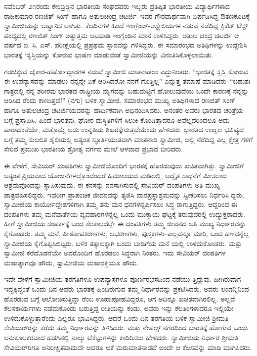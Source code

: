 ನವೆಂಬರ್ ೨೧ರಂದು ಕೇಂಬ್ರಿಡ್ಜಿನ ಭಾರತೀಯ ಸಂಘದವರು ಇಬ್ಬರು ಪ್ರತಿಷ್ಠಿತ ಭಾರತೀಯ ವಿದ್ಯಾರ್ಥಿಗಳಾದ ರಾಜಕುಮಾರ ರಣಜಿತ್ ಸಿಂಗ್ ಹಾಗೂ ಅತುಲಚಂದ್ರ ಚಟರ್ಜಿ–ಇವರ ಗೌರವಾರ್ಥವಾಗಿ ಏರ್ಪಡಿಸಿದ್ದ ಔತಣಕೂಟಕ್ಕೆ ಸ್ವಾಮೀಜಿಯನ್ನು ಆಹ್ವಾನಿಸ ಲಾಗಿತ್ತು. ಕೆಲದಿನಗಳ ಹಿಂದೆ ಇಂಗ್ಲೆಂಡ್​-ಆಸ್ಟ್ರೇಲಿಯಗಳ ನಡುವೆ ನಡೆದಿದ್ದ ಕ್ರಿಕೆಟ್ ಟೆಸ್ಟ್ ಪಂದ್ಯದಲ್ಲಿ ರಣಜಿತ್ ಸಿಂಗ್ ಅತ್ಯುತ್ತಮ ಆಟವಾಡಿ ಇಂಗ್ಲೆಂಡಿನ ಮಾನ ಉಳಿಸಿದ್ದರು. ಅತುಲ ಚಂದ್ರ ಚಟರ್ಜಿ ಆ ವರ್ಷದ ಐ. ಸಿ. ಎಸ್. ಪರೀಕ್ಷೆಯಲ್ಲಿ ಪ್ರಪ್ರಥಮ ಸ್ಥಾನವನ್ನು ಗಳಿಸಿದ್ದರು. ಈ ಸಮಾರಂಭದ ಅತಿಥಿಗಳನ್ನು ಉದ್ದೇಶಿಸಿ ಭಾರತಕ್ಕೆ ‘ಸ್ವಸ್ತಿಯನ್ನು ಕೋರುವ ಭಾಷಣ ಮಾಡುವಂತೆ ಸ್ವಾಮೀಜಿಯನ್ನು ವಿನಂತಿಸಿಕೊಳ್ಳಲಾಯಿತು.

ಗಡಚಿಕ್ಕುವ ಜೈಕಾರ-ಹರ್ಷೋದ್ಗಾರಗಳ ನಡುವೆ ಸ್ವಾಮೀಜಿ ಮಾತನಾಡಲು ಎದ್ದುನಿಂತರು. “ಭಾರತಕ್ಕೆ ಸ್ವಸ್ತಿ ಕೋರುವ ಈ ಉಪನ್ಯಾಸವನ್ನು ಮಾಡಲು ನನ್ನನ್ನೇ ಏಕೆ ಆರಿಸಿದರೋ ನನಗೆ ಗೊತ್ತಿಲ್ಲ” ಎನ್ನುತ್ತ ತಮಾಷೆ ಮಾಡಿದರು–“ಬಹುಶಃ ಗಾತ್ರದಲ್ಲಿ ನನ್ನ ಶರೀರವು ಭಾರತದ ರಾಷ್ಟ್ರೀಯ ಮೃಗವನ್ನು ಬಹುಮಟ್ಟಿಗೆ ಹೋಲುವುದೆಂಬ ಒಂದೇ ಕಾರಣಕ್ಕೆ ನನ್ನನ್ನು ಆರಿಸಿದ ರೆಂದು ಕಾಣುತ್ತದೆ!” (ನಗು) ಬಳಿಕ ಸ್ವಾಮೀಜಿ, ಸಮಾರಂಭದ ಮುಖ್ಯ ಅತಿಥಿಗಳಾದ ರಣಜಿತ್ ಸಿಂಗ್ ಹಾಗೂ ಅತುಲಚಂದ್ರ ಚಟರ್ಜಿಯವರನ್ನು ಹಾರ್ದಿಕವಾಗಿ ಅಭಿನಂದಿಸಿದರು. ಅನಂತರ ಅವರು ಭಾರತದ ಚರಿತ್ರೆಯ ಬಗ್ಗೆ ಪ್ರಸ್ತಾಪಿಸಿ, ಹಿಂದೆ ಭಾರತವು, ಘೋರ ದುಸ್ಥಿತಿಗಳಿಗೆ ಸಿಲುಕಿ ಕೊಂಡಿತ್ತಾದರೂ ಅವೆಲ್ಲದರಿಂದಲೂ ಅದು ಪಾರಾದಂತೆಯೇ, ಮತ್ತೊಮ್ಮೆ ಅದು ಉನ್ನತಿಯ ಶಿಖರಕ್ಕೇರುತ್ತದೆಯೆಂದು ಹೇಳಿದರು. ಭಾರತದ ಉಜ್ವಲ ಭವಿಷ್ಯದ ಬಗ್ಗೆ ತಮ್ಮ ಸುಲಲಿತ ಶೈಲಿಯಲ್ಲಿ ಅತ್ಯಂತ ಸ್ಫೂರ್ತಿಯುತವಾಗಿ ಮಾತನಾಡಿ ಸ್ವಾಮೀಜಿ, ಅಲ್ಲಿ ನೆರೆದಿದ್ದ ಎಲ್ಲ ಕ್ಷೇತ್ರ ಗಳಿಗೆ ಸೇರಿದ ಪ್ರಮುಖ ಭಾರತೀಯ ಶ್ರೋತೃ ವರ್ಗದ ಮೇಲೆ ಆಳವಾದ ಪ್ರಭಾವ ಬೀರಿದರು.

ಈ ವೇಳೆಗೆ, ಸೇವಿಯರ್ ದಂಪತಿಗಳು ಸ್ವಾಮೀಜಿಯೊಂದಿಗೆ ಭಾರತಕ್ಕೆ ಹೊರಡುವುದು ಖಚಿತವಾಗಿತ್ತು. ಸ್ವಾಮೀಜಿಗೆ ಅತ್ಯಂತ ಪ್ರಿಯವಾದ ಯೋಜನೆಗಳಲ್ಲೊಂದೆಂದರೆ ಹಿಮಾಲಯದ ಮಡಿಲಲ್ಲಿ, ಅದ್ವೈತ ಸಾಧನೆಗೆ ಮೀಸಲಾದ ಆಶ್ರಮವೊಂದನ್ನು ಸ್ಥಾಪಿಸುವುದು. ಈ ಕನಸನ್ನು ನನಸಾಗಿಸುವಲ್ಲಿ ಸೇವಿಯರ್ ದಂಪತಿಗಳು ಅತಿ ಮುಖ್ಯ ಪಾತ್ರವಹಿಸಲಿದ್ದರು. ಇವರೀಗ ಪ್ರಾಪಂಚಿಕ ಜೀವನವನ್ನು ತ್ಯಜಿಸಿ ವಾನಪ್ರಸ್ಥಾಶ್ರಮವನ್ನು ಸ್ವೀಕರಿಸಲು ನಿರ್ಧರಿಸಿ ದ್ದರು; ಸ್ವಾಮೀಜಿಯ ಕಾರ್ಯೋದ್ದೇಶಗಳಿಗಾಗಿ ತಮ್ಮ ತನು ಮನ ಧನಗಳನ್ನರ್ಪಿಸಲು ಸಿದ್ಧ ರಾಗುತ್ತಿದ್ದರು. ಆದ್ದರಿಂದ ಈ ದಂಪತಿಗಳು ತಮ್ಮ ಮನೆವಾರ್ತೆಯ ವ್ಯವಹಾರಗಳನ್ನೆಲ್ಲ ಒಂದು ಮುಕ್ತಾಯ ಘಟ್ಟಕ್ಕೆ ತರುವುದರಲ್ಲಿ ಉದ್ಯುಕ್ತರಾದರು. ಹೀಗೆ ಸ್ವಾಮೀಜಿಯ ಸಂಪರ್ಕಕ್ಕೆ ಬಂದ ಕೆಲಕಾಲದಲ್ಲೇ ಈ ದಂಪತಿಗಳು ತಮ್ಮ ಜೀವನದ ಅತಿ ಮುಖ್ಯ ನಿರ್ಧಾರವನ್ನು ಕೈಗೊಂಡರು. ತಮ್ಮ ಮನೆ, ಪೀಠೋಪಕರಣಗಳು, ಆಭರಣಗಳು, ಪುಸ್ತಕಗಳು–ಎಲ್ಲವನ್ನೂ ಮಾರಿ, ಬಂದ ಹಣವನ್ನೆಲ್ಲ ಸ್ವಾಮೀಜಿಯ ಕೈಗೊಪ್ಪಿಸಿಬಿಟ್ಟರು. ಬಳಿಕ ತತ್ಕಾಲಕ್ಕಾಗಿ ಒಂದು ಬಾಡಿಗೆಯ ಮನೆ ಯಲ್ಲಿ ಉಳಿದುಕೊಂಡರು. ಮತ್ತು ಸ್ವಾಮೀಜಿ ಕರೆದೊಡನೆಯೇ ಅವರೊಂದಿಗೆ ಹೊರಡಲು ಸಿದ್ಧರಾಗಿ ನಿಂತರು. ಇದು ಸೇವಿಯರ್ ದಂಪತಿಗಳ ಮಹಾತ್ಯಾಗವೂ ಹೌದು, ಸ್ವಾಮೀಜಿಯ ಮಹಾಶಕ್ತಿಯೂ ಹೌದು.

ಇದೇ ವೇಳೆಗೆ ಸ್ವಾಮೀಜಿಯ ತರಗತಿಗಳೂ ಉಪನ್ಯಾಸಗಳೂ ಪೂರ್ಣರಭಸದಿಂದ ನಡೆಯು ತ್ತಿದ್ದುವು. ಹೀಗಿರುವಾಗ ಇದ್ದಕ್ಕಿದ್ದಂತೆ ಒಂದು ದಿನ ಅವರು ಭಾರತಕ್ಕೆ ಹಿಂದಿರುಗುವ ತಮ್ಮ ನಿರ್ಧಾರವನ್ನು ಪ್ರಕಟಿಸಿದರು. ಅವರು ಲಂಡನ್ನಿನಿಂದ ಹೊರಡುವ ಬಗ್ಗೆ ಆಲೋಚಿಸುತ್ತಿದ್ದಾ ರೆಂಬ ಊಹಾಪೋಹವಿದ್ದರೂ, ಆಗ ಅದಿನ್ನೂ ಖಚಿತವಾಗಿರಲಿಲ್ಲ. ಅಲ್ಲದೆ ಕೆಲಸಕಾರ್ಯಗಳು ನಡೆದುಕೊಂಡು ಬರುತ್ತಿದ್ದ ರೀತಿಯನ್ನು ಕಂಡು, ಅವರು ಇನ್ನು ಕೆಲತಿಂಗಳಾದರೂ ಇಲ್ಲಿಯೇ ಉಳಿದುಕೊಳ್ಳುತ್ತಾರೆಂದು ಎಲ್ಲರೂ ಭಾವಿಸಿದ್ದರು. ಆದರೆ ಒಂದು ದಿನ ತರಗತಿಯ ಬಳಿಕ ಸ್ವಾಮೀಜಿ ಶ್ರೀಮತಿ ಸೇವಿಯರ್​ರನ್ನು ಕರೆದು ತಮ್ಮ ನಿರ್ಧಾರವನ್ನು ತಿಳಿಸಿದರು. ಮತ್ತು ನೇಪಲ್ಸ್ ನಗರದಿಂದ ಭಾರತಕ್ಕೆ ಹೋಗುವ ಒಂದು ಅನುಕೂಲಕರವಾದ ಹಡಗಿನಲ್ಲಿ ನಾಲ್ಕು ಟೆಕೆಟ್ಟುಗಳನ್ನು ಕಾದಿರಿಸಲು ಹೇಳಿದರು. ಸ್ವಾಮೀಜಿಯ ನಿರ್ಧಾರ ಶ್ರೀಮತಿ ಸೇವಿಯರ್​ರಿಗೂ ಅನಿರೀಕ್ಷಿತವಾದುದೇ ಆದರೂ ಆಕೆ ಮರುಮಾತನಾಡದೆ ಅಂದೇ ಆ ಕೆಲಸವನ್ನು ಮಾಡಿ ಮುಗಿಸಿದರು.

